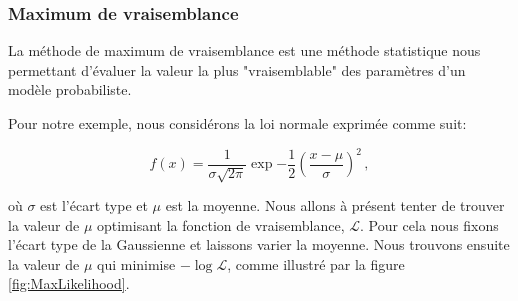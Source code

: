 \subsubsection{Maximum de vraisemblance}
La méthode de maximum de vraisemblance est une méthode statistique nous permettant d'évaluer la valeur la plus "vraisemblable" des paramètres d'un modèle probabiliste. 

Pour notre exemple, nous considérons la loi normale exprimée comme suit:

\begin{equation}
f(x) = \frac{1}{\sigma\sqrt{2\pi}} \exp{-\frac{1}{2} \left( \frac{x-\mu}{\sigma}\right)^2} \,  , 
\end{equation}

où $\sigma$ est l'écart type et $\mu$ est la moyenne. Nous allons à présent tenter de trouver la valeur de $\mu$ optimisant la fonction de vraisemblance,  $\mathcal{L}$. Pour cela nous fixons l'écart type de la Gaussienne et laissons varier la moyenne. Nous trouvons ensuite la valeur de $\mu$ qui minimise $-\log{\mathcal{L}}$, comme illustré par la figure \ref{fig:MaxLikelihood}.

